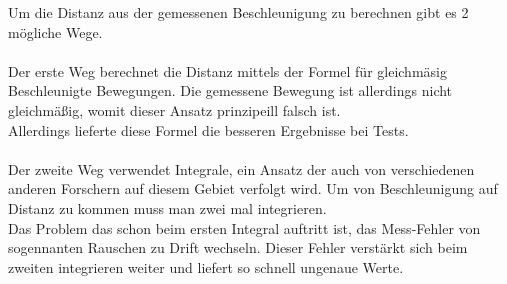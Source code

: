 Um die Distanz aus der gemessenen Beschleunigung zu berechnen
gibt es 2 mögliche Wege. \\
\\
Der erste Weg berechnet die Distanz 
mittels der Formel für gleichmäsig Beschleunigte Bewegungen.
Die gemessene Bewegung ist allerdings nicht gleichmäßig, womit
dieser Ansatz prinzipeill falsch ist.\\
Allerdings lieferte diese Formel die besseren Ergebnisse 
bei Tests.\\
\\
Der zweite Weg verwendet Integrale, ein Ansatz der auch von
verschiedenen anderen Forschern auf diesem Gebiet verfolgt wird.
Um von Beschleunigung auf Distanz zu kommen muss man zwei mal 
integrieren.\\
Das Problem das schon beim ersten Integral auftritt ist, 
das Mess-Fehler von sogennanten Rauschen zu Drift wechseln.
Dieser Fehler verstärkt sich beim zweiten integrieren weiter 
und liefert so schnell ungenaue Werte.\\